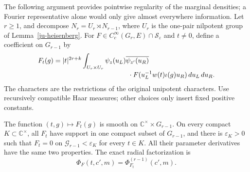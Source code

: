 The following argument provides pointwise regularity of
the marginal densities; a Fourier representative alone
would only give almost everywhere information.
Let \(r\geq1\), and decompose
\(N_r=U_r\rtimes N_{r-1}\), where \(U_r\) is the
one-pair nilpotent group of Lemma~\ref{ju-heisenberg}.
For \(F\in C_c^\infty(G_r,E)\cap\mathscr S_\varepsilon\)
and \(t\ne0\), define a coefficient on \(G_{r-1}\) by
\begin{equation}\label{jf-slice-family}
 \begin{split}
 F_t(g)={}&|t|^{2r+k}
   \int_{U_r\times U_r}
       \psi_z(u_L)\overline{\psi_{z'}(u_R)}\\[-2pt]
       &\hspace{34mm}\cdot
          F(u_L^{-1}w(t)\iota(g)u_R)\,du_L\,du_R.
 \end{split}
\end{equation}
The characters are the restrictions of the original
unipotent characters.  Use recursively compatible Haar
measures; other choices only insert fixed positive constants.

\begin{proposition}\label{jf-compact-family}
The function \((t,g)\mapsto F_t(g)\) is smooth on
\(\mathbb C^\times\times G_{r-1}\).  On every compact
\(K\subset\mathbb C^\times\), all \(F_t\) have support
in one compact subset of \(G_{r-1}\), and there is
\(\varepsilon_K>0\) such that \(F_t=0\) on
\(\mathcal G_{r-1}<\varepsilon_K\) for every \(t\in K\).
All their parameter derivatives have the same two properties.
The exact radial factorization is
\begin{equation}\label{jf-factorization}
                  \Phi_F(t,c',m)=\Phi^{(r-1)}_{F_t}(c',m).
\end{equation}
\end{proposition}

